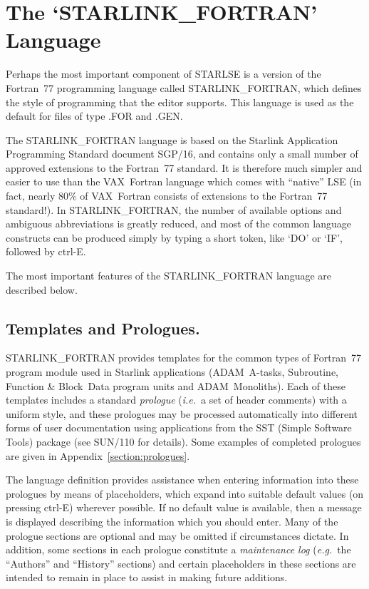 \section{The `STARLINK\_FORTRAN' Language}

Perhaps the most important component of \mbox{STARLSE} is a version of the
Fortran~77 programming language called \mbox{STARLINK\_FORTRAN}, which
defines the style of programming that the editor supports. 
This language is used as the default for files of type \mbox{.FOR} and
\mbox{.GEN}. 

The \mbox{STARLINK\_FORTRAN} language is based on the Starlink Application
Programming Standard document SGP/16, and contains only a small number of
approved extensions to the Fortran~77 standard. 
It is therefore much simpler and easier to use than the \mbox{VAX}~Fortran
language which comes with ``native'' \mbox{LSE} (in fact, nearly 80\% of
\mbox{VAX}~Fortran consists of extensions to the Fortran~77 standard!). 
In \mbox{STARLINK\_FORTRAN}, the number of available options and ambiguous
abbreviations is greatly reduced, and most of the common language constructs
can be produced simply by typing a short token, like `DO' or `IF', followed
by \mbox{ctrl-E}. 

The most important features of the \mbox{STARLINK\_FORTRAN} language are
described below.


\subsection{Templates and Prologues.}

\mbox{STARLINK\_FORTRAN} provides templates for the common types of
Fortran~77 program module used in Starlink applications
(\mbox{ADAM}~\mbox{A-tasks}, \mbox{Subroutine}, \mbox{Function} \&
\mbox{Block}~\mbox{Data} program units and ADAM~Monoliths). 
Each of these templates includes a standard {\em prologue} ({\em i.e.}\ a
set of header comments) with a uniform style, and these prologues may be
processed automatically into different forms of user documentation using
applications from the SST (Simple Software Tools) package (see SUN/110 for
details). 
Some examples of completed prologues are given in
Appendix~\ref{section:prologues}. 

The language definition provides assistance when entering information into
these prologues by means of placeholders, which expand into suitable default
values (on pressing \mbox{ctrl-E}) wherever possible.
If no default value is available, then a message is displayed describing the 
information which you should enter.
Many of the prologue sections are optional and may be omitted if
circumstances dictate. 
In addition, some sections in each prologue constitute a {\em maintenance
log} ({\em e.g.}\ the ``Authors'' and ``History'' sections) and certain
placeholders in these sections are intended to remain in place to assist in
making future additions. 

